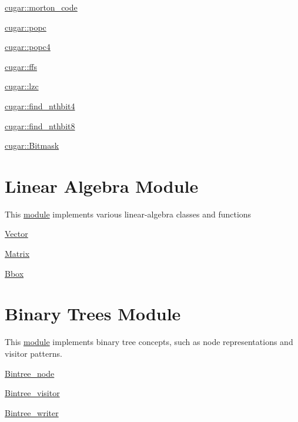 \begin{DoxyItemize}
\item \hyperlink{group___bits_module_ga6494ab687521f35e3e28dc1524d15218}{cugar\+::morton\+\_\+code}
\item \hyperlink{group___bits_module_ga88a87094ba5547f8896d8947adfdec58}{cugar\+::popc}
\item \hyperlink{group___bits_module_ga4bc7fb7acba5b770553c58bfae69f5af}{cugar\+::popc4}
\item \hyperlink{group___bits_module_ga68f09d26fa95c119a5263f856365db42}{cugar\+::ffs}
\item \hyperlink{group___bits_module_gad2be8d91a93a10a6a9601f4f89bf752b}{cugar\+::lzc}
\item \hyperlink{group___bits_module_ga7f02d582847e11ea8454216ad36dc77b}{cugar\+::find\+\_\+nthbit4}
\item \hyperlink{group___bits_module_ga38b135612da4fe8202152a56dc9b9508}{cugar\+::find\+\_\+nthbit8}
\item \hyperlink{structcugar_1_1_bitmask}{cugar\+::\+Bitmask} 
\end{DoxyItemize}\hypertarget{linalg_page}{}\section{Linear Algebra Module}\label{linalg_page}
This \hyperlink{group___linalg_module}{module} implements various linear-\/algebra classes and functions


\begin{DoxyItemize}
\item \hyperlink{structcugar_1_1_vector}{Vector}
\item \hyperlink{structcugar_1_1_matrix}{Matrix}
\item \hyperlink{structcugar_1_1_bbox}{Bbox} 
\end{DoxyItemize}\hypertarget{bintree_page}{}\section{Binary Trees Module}\label{bintree_page}
This \hyperlink{group__bintree}{module} implements binary tree concepts, such as node representations and visitor patterns.


\begin{DoxyItemize}
\item \hyperlink{structcugar_1_1_bintree__node}{Bintree\+\_\+node}
\item \hyperlink{structcugar_1_1_bintree__visitor}{Bintree\+\_\+visitor}
\item \hyperlink{structcugar_1_1_bintree__writer}{Bintree\+\_\+writer}
\end{DoxyItemize}


